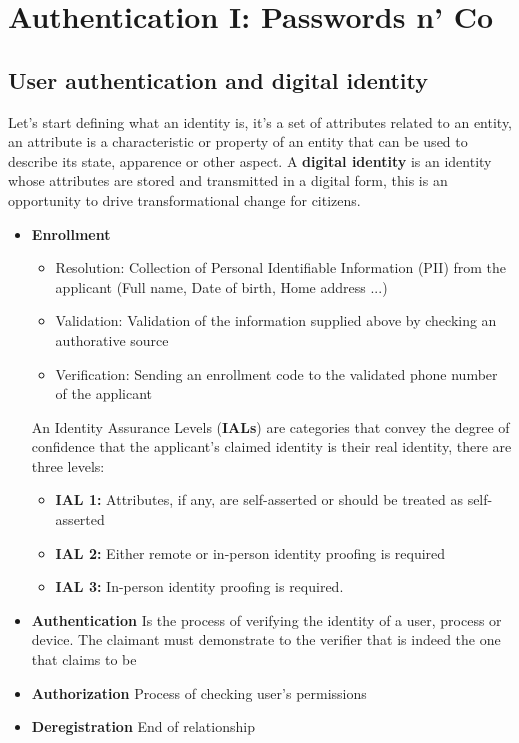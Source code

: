 \section{Authentication I: Passwords n' Co}
    \subsection{User authentication and digital identity}
    Let's start defining what an identity is, it's a set of attributes related to an entity, an attribute is a characteristic or property of an entity that can be used to describe its state, apparence or other aspect. A 
    \textbf{digital identity} is an identity whose attributes are stored and transmitted in a digital form, this is an opportunity to drive transformational change for citizens.
    
    \begin{itemize}
        \item \textbf{Enrollment}
        \begin{itemize}
            \item Resolution: Collection of Personal Identifiable Information (PII) from the applicant (Full name, Date of birth, Home address ...)
            \item Validation: Validation of the information supplied above by checking an authorative source
            \item Verification: Sending an enrollment code to the validated phone number of the applicant 
        \end{itemize}   
        An Identity Assurance Levels (\textbf{IALs}) are categories that convey the degree of confidence that the applicant's claimed identity is their real identity, there are three levels:
        \begin{itemize}
            \item \textbf{IAL 1:} Attributes, if any, are self-asserted or should be treated as self-asserted
            \item \textbf{IAL 2:} Either remote or in-person identity proofing is required
            \item \textbf{IAL 3:} In-person identity proofing is required. 
        \end{itemize}
        \item \textbf{Authentication} Is the process of verifying the identity of a user, process or device. The claimant must demonstrate to the verifier that is indeed the one that claims to be
        \item \textbf{Authorization} Process of checking user's permissions
        \item \textbf{Deregistration} End of relationship
    \end{itemize} 
    
